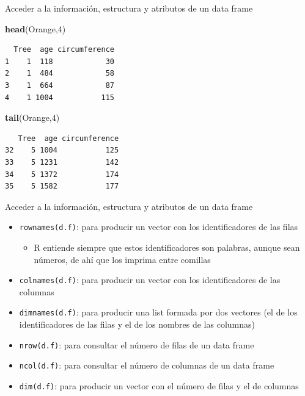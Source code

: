\documentclass[
  ignorenonframetext,
  aspectratio=169]{beamer}
\newenvironment{Shaded}{\begin{snugshade}}{\end{snugshade}}
\newcommand{\DecValTok}[1]{\textcolor[rgb]{0.00,0.00,0.81}{#1}}
\newcommand{\FunctionTok}[1]{\textcolor[rgb]{0.13,0.29,0.53}{\textbf{#1}}}
\newcommand{\NormalTok}[1]{#1}
\providecommand{\tightlist}{%
  \setlength{\itemsep}{0pt}\setlength{\parskip}{0pt}}
\begin{document}
\begin{frame}[fragile]{Acceder a la información, estructura y atributos
de un data frame}
\label{acceder-a-la-informaciuxf3n-estructura-y-atributos-de-un-data-frame-2}
\begin{Shaded}
\begin{Highlighting}[]
\FunctionTok{head}\NormalTok{(Orange,}\DecValTok{4}\NormalTok{)}
\end{Highlighting}
\end{Shaded}

\begin{verbatim}
  Tree  age circumference
1    1  118            30
2    1  484            58
3    1  664            87
4    1 1004           115
\end{verbatim}

\begin{Shaded}
\begin{Highlighting}[]
\FunctionTok{tail}\NormalTok{(Orange,}\DecValTok{4}\NormalTok{)}
\end{Highlighting}
\end{Shaded}

\begin{verbatim}
   Tree  age circumference
32    5 1004           125
33    5 1231           142
34    5 1372           174
35    5 1582           177
\end{verbatim}
\end{frame}

\begin{frame}[fragile]{Acceder a la información, estructura y atributos
de un data frame}
\label{acceder-a-la-informaciuxf3n-estructura-y-atributos-de-un-data-frame-3}
\begin{itemize}
\tightlist
\item
  \texttt{rownames(d.f)}: para producir un vector con los
  identificadores de las filas

  \begin{itemize}
  \tightlist
  \item
    R entiende siempre que estos identificadores son palabras, aunque
    sean números, de ahí que los imprima entre comillas
  \end{itemize}
\item
  \texttt{colnames(d.f)}: para producir un vector con los
  identificadores de las columnas
\item
  \texttt{dimnames(d.f)}: para producir una list formada por dos
  vectores (el de los identificadores de las filas y el de los nombres
  de las columnas)
\item
  \texttt{nrow(d.f)}: para consultar el número de filas de un data frame
\item
  \texttt{ncol(d.f)}: para consultar el número de columnas de un data
  frame
\item
  \texttt{dim(d.f)}: para producir un vector con el número de filas y el
  de columnas
\end{itemize}
\end{frame}
\end{document}
